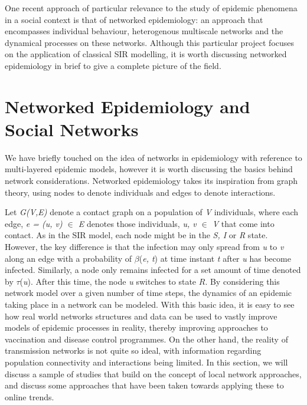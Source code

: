 \documentclass[11pt, a4paper, oneside,titlepage]{article}
\begin{document}
One recent approach of particular relevance to the study of epidemic
phenomena in a social context is that of networked epidemiology: an
approach that encompasses individual behaviour, heterogenous
multiscale networks and the dynamical processes on these
networks. Although this particular project focuses on the application
of classical SIR modelling, it is worth discussing networked
epidemiology in brief to give a complete picture of the field.

\section*{Networked Epidemiology and Social Networks} 

We have briefly touched on the idea of networks in epidemiology with
reference to multi-layered epidemic models, however it is worth
discussing the basics behind network considerations.\cite{tizzoni,
  gefm} Networked epidemiology takes its inspiration from graph
theory, using nodes to denote individuals and edges to denote
interactions. 

Let \emph{G(V,E)} denote a contact graph on a population of \emph{V}
individuals, where each edge, \emph{e = (u, v) $\in$ E} denotes those
individuals, \emph{u, v $\in$ V} that come into contact. As in the SIR
model, each node might be in the \emph{ S, I} or \emph{R}
state. However, the key difference is that the infection may only
spread from \emph{u} to \emph{v} along an edge with a probability of
$\beta$(\emph{e, t}) at time instant \emph{t} after \emph{u} has
become infected. Similarly, a node only remains infected for a set
amount of time denoted by $\tau$(\emph{u}). After this time, the node
\emph{u} switches to state $R$. By considering this network model over
a given number of time steps, the dynamics of an epidemic taking place
in a network can be modeled. With this basic idea, it is easy to see
how real world networks structures and data can be used to vastly
improve models of epidemic processes in reality, thereby improving
approaches to vaccination and disease control programmes.\cite{danon}
On the other hand, the reality of transmission networks is not quite
so ideal, with information regarding population connectivity and
interactions being limited. In this section, we will discuss a sample
of studies that build on the concept of local network approaches, and
discuss some approaches that have been taken towards applying these to
online trends.
\end{document}

